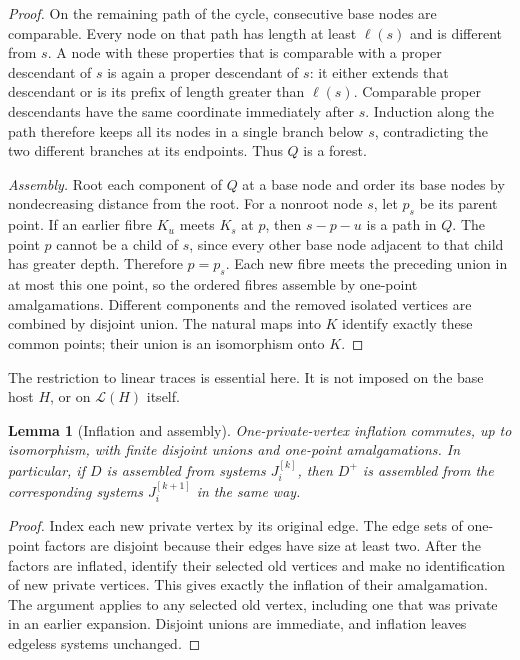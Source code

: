 \documentclass[a4paper,11pt,reqno]{amsart}
\newcommand{\proofpart}[1]{%
  \par\smallskip\noindent\textit{#1.}\enspace\ignorespaces}
\theoremstyle{plain}
\newtheorem{lemma}[theorem]{Lemma}
\theoremstyle{definition}
\theoremstyle{remark}
\begin{document}
\begin{proof}
On the remaining path of the cycle, consecutive base nodes are comparable.
Every node on that path has length at least $\ell(s)$ and is different from
$s$.  A node with these properties that is comparable with a proper
descendant of $s$ is again a proper descendant of $s$: it either extends
that descendant or is its prefix of length greater than $\ell(s)$.  Comparable
proper descendants have the same coordinate immediately after $s$.
Induction along the path therefore keeps all its nodes in a single branch
below $s$, contradicting the two different branches at its endpoints.
Thus $Q$ is a forest.

\proofpart{Assembly}
Root each component of $Q$ at a base node and order its base nodes by
nondecreasing distance from the root.  For a nonroot node $s$, let $p_s$
be its parent point.  If an earlier fibre $K_u$ meets $K_s$ at $p$, then
$s-p-u$ is a path in $Q$.  The point $p$ cannot be a child of $s$, since
every other base node adjacent to that child has greater depth.  Therefore
$p=p_s$.  Each new fibre meets the preceding union in at most this one
point, so the ordered fibres assemble by one-point amalgamations.
Different components and the removed isolated vertices are combined by
disjoint union.  The natural maps into $K$ identify exactly these common
points; their union is an isomorphism onto $K$.
\end{proof}

The restriction to linear traces is essential here.  It is not imposed on
the base host $H$, or on $\mathcal L(H)$ itself.

\begin{lemma}[Inflation and assembly]
\label{uniform-inflation-assembly}
One-private-vertex inflation commutes, up to isomorphism, with finite
disjoint unions and one-point amalgamations.  In particular, if $D$ is
assembled from systems $J_i^{[k]}$, then $D^+$ is assembled from the
corresponding systems $J_i^{[k+1]}$ in the same way.
\end{lemma}
\begin{proof}
Index each new private vertex by its original edge.  The edge sets of
one-point factors are disjoint because their edges have size at least two.
After the factors are inflated, identify their selected old vertices and
make no identification of new private vertices.  This gives exactly the
inflation of their amalgamation.  The argument applies to any selected
old vertex, including one that was private in an earlier expansion.
Disjoint unions are immediate, and inflation leaves edgeless systems
unchanged.
\end{proof}
\end{document}
